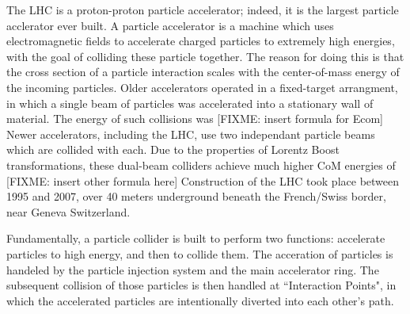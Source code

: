     The LHC is a proton-proton particle accelerator; indeed, it is the largest particle acclerator ever built.
    A particle accelerator is a machine which uses electromagnetic fields to accelerate charged particles to extremely high energies, with the goal of colliding these particle together.
    The reason for doing this is that the cross section of a particle interaction scales with the center-of-mass energy of the incoming particles. %
    Older accelerators operated in a fixed-target arrangment, in which a single beam of particles was accelerated into a stationary wall of material.
    The energy of such collisions was [FIXME: insert formula for Ecom]
    Newer accelerators, including the LHC, use two independant particle beams which are collided with each.
    Due to the properties of Lorentz Boost transformations, these dual-beam colliders achieve much higher CoM energies of [FIXME: insert other formula here] \cite{modern_and_future_colliders}
    Construction of the LHC took place between 1995 and 2007, over 40 meters underground beneath the French/Swiss border, near Geneva Switzerland. 


    Fundamentally, a particle collider is built to perform two functions: accelerate particles to high energy, and then to collide them.
    The acceration of particles is handeled by the particle injection system and the main accelerator ring.
    The subsequent collision of those particles is then handled at ``Interaction Points", in which the accelerated particles are intentionally diverted into each other's path.


